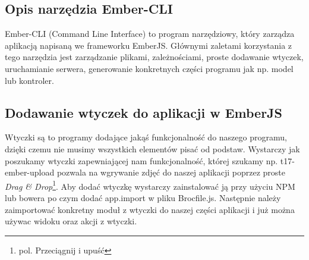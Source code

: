 \documentclass[brudnopis]{xmgr}
\begin{document}
\subsection{Opis narzędzia Ember-CLI}
Ember-CLI (Command Line Interface) to program narzędziowy, który zarządza aplikacją napisaną we frameworku EmberJS. Głównymi zaletami korzystania z tego narzędzia jest zarządzanie plikami, zależnościami, proste dodawanie wtyczek, uruchamianie serwera, generowanie konkretnych części programu jak np. model lub kontroler.

\subsection{Dodawanie wtyczek do aplikacji w EmberJS}
Wtyczki są to programy dodające jakąś funkcjonalność do naszego programu, dzięki czemu nie musimy wszystkich elementów pisać od podstaw. Wystarczy jak poszukamy wtyczki zapewniającej nam funkcjonalność, której szukamy np. t17-ember-upload pozwala na wgrywanie zdjęć do naszej aplikacji poprzez proste \textit{Drag \& Drop}\footnote{pol. Przeciągnij i upuść}.  Aby dodać wtyczkę wystarczy zainstalować ją przy użyciu NPM lub bowera  po czym dodać app.import w pliku Brocfile.js. Następnie należy zaimportować konkretny moduł z wtyczki do naszej części aplikacji i już można używac widoku oraz akcji z wtyczki.
\end{document}
